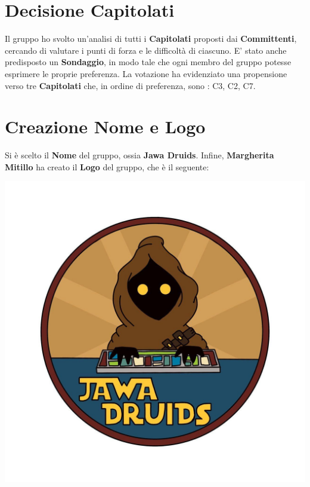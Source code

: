 	\section{Decisione Capitolati}
	Il gruppo ho svolto un'analisi di tutti i \textbf{Capitolati} proposti dai \textbf{Committenti}, cercando di valutare i punti di forza e le difficoltà di ciascuno. 
	E' stato anche predisposto un \textbf{Sondaggio}, in modo tale che ogni membro del gruppo potesse esprimere le proprie preferenza. 
	La votazione ha evidenziato una propensione verso tre \textbf{Capitolati} che, in ordine di preferenza, sono : C3, C2, C7.
	 
	\section{Creazione Nome e Logo}
	Si è scelto il \textbf{Nome} del gruppo, ossia \textbf{Jawa Druids}.
	Infine, \textbf{Margherita Mitillo} ha creato il  \textbf{Logo} del gruppo, che è il seguente:\\
	\begin{center}
			\includegraphics[width=0.5\linewidth]{../../immagini/DRUIDSLOGO.jpg}\\[4ex]
	\end{center}

